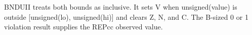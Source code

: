 BNDUII treats both bounds as inclusive. It sets V when unsigned(value) is outside [unsigned(lo), unsigned(hi)] and clears Z, N, and C. The B-sized 0 or 1 violation result supplies the REPcc observed value.
